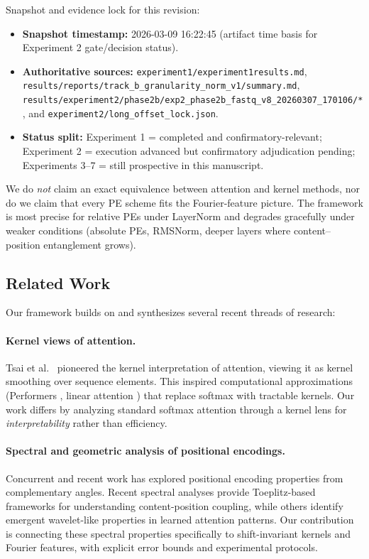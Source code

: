 \documentclass[11pt]{article}
\theoremstyle{definition}
\begin{document}
Snapshot and evidence lock for this revision:
\begin{itemize}
    \item \textbf{Snapshot timestamp:} 2026-03-09 16:22:45 (artifact time basis for Experiment 2 gate/decision status).
    \item \textbf{Authoritative sources:} \texttt{experiment1/experiment1results.md}, \texttt{results/reports/track\_b\_granularity\_norm\_v1/summary.md}, \texttt{results/experiment2/phase2b/exp2\_phase2b\_fastq\_v8\_20260307\_170106/*}, and \texttt{experiment2/long\_offset\_lock.json}.
    \item \textbf{Status split:} Experiment 1 = completed and confirmatory-relevant; Experiment 2 = execution advanced but confirmatory adjudication pending; Experiments 3--7 = still prospective in this manuscript.
\end{itemize}

We do \emph{not} claim an exact equivalence between attention and kernel methods, nor do we claim that every PE scheme fits the Fourier-feature picture. The framework is most precise for relative PEs under LayerNorm and degrades gracefully under weaker conditions (absolute PEs, RMSNorm, deeper layers where content--position entanglement grows).

\subsection{Related Work}

Our framework builds on and synthesizes several recent threads of research:

\paragraph{Kernel views of attention.} Tsai et al.\ \cite{tsai2019transformer} pioneered the kernel interpretation of attention, viewing it as kernel smoothing over sequence elements. This inspired computational approximations (Performers \cite{choromanski2021performers}, linear attention \cite{katharopoulos2020linear}) that replace softmax with tractable kernels. Our work differs by analyzing standard softmax attention through a kernel lens for \emph{interpretability} rather than efficiency.

\paragraph{Spectral and geometric analysis of positional encodings.} Concurrent and recent work has explored positional encoding properties from complementary angles. Recent spectral analyses \cite{unpacking2025spectral} provide Toeplitz-based frameworks for understanding content-position coupling, while others \cite{wavelet2024beyond} identify emergent wavelet-like properties in learned attention patterns. Our contribution is connecting these spectral properties specifically to shift-invariant kernels and Fourier features, with explicit error bounds and experimental protocols.
\end{document}
